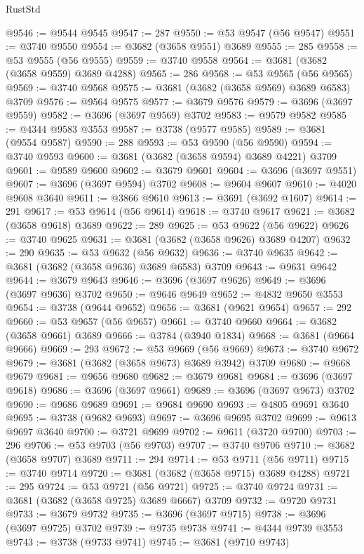 \begin{lexlean}{RustStd}
\begin{coremodule}
@9546 := @9544 @9545
@9547 := 287
@9550 := @53 @9547 (@56 @9547)
@9551 := @3740 @9550
@9554 := @3682 (@3658 @9551) @3689
@9555 := 285
@9558 := @53 @9555 (@56 @9555)
@9559 := @3740 @9558
@9564 := @3681 (@3682 (@3658 @9559) @3689 @4288)
@9565 := 286
@9568 := @53 @9565 (@56 @9565)
@9569 := @3740 @9568
@9575 := @3681 (@3682 (@3658 @9569) @3689 @6583) @3709
@9576 := @9564 @9575
@9577 := @3679 @9576
@9579 := @3696 (@3697 @9559)
@9582 := @3696 (@3697 @9569) @3702
@9583 := @9579 @9582
@9585 := @4344 @9583 @3553
@9587 := @3738 (@9577 @9585)
@9589 := @3681 (@9554 @9587)
@9590 := 288
@9593 := @53 @9590 (@56 @9590)
@9594 := @3740 @9593
@9600 := @3681 (@3682 (@3658 @9594) @3689 @4221) @3709
@9601 := @9589 @9600
@9602 := @3679 @9601
@9604 := @3696 (@3697 @9551)
@9607 := @3696 (@3697 @9594) @3702
@9608 := @9604 @9607
@9610 := @4020 @9608 @3640
@9611 := @3866 @9610
@9613 := @3691 (@3692 @1607)
@9614 := 291
@9617 := @53 @9614 (@56 @9614)
@9618 := @3740 @9617
@9621 := @3682 (@3658 @9618) @3689
@9622 := 289
@9625 := @53 @9622 (@56 @9622)
@9626 := @3740 @9625
@9631 := @3681 (@3682 (@3658 @9626) @3689 @4207)
@9632 := 290
@9635 := @53 @9632 (@56 @9632)
@9636 := @3740 @9635
@9642 := @3681 (@3682 (@3658 @9636) @3689 @6583) @3709
@9643 := @9631 @9642
@9644 := @3679 @9643
@9646 := @3696 (@3697 @9626)
@9649 := @3696 (@3697 @9636) @3702
@9650 := @9646 @9649
@9652 := @4832 @9650 @3553
@9654 := @3738 (@9644 @9652)
@9656 := @3681 (@9621 @9654)
@9657 := 292
@9660 := @53 @9657 (@56 @9657)
@9661 := @3740 @9660
@9664 := @3682 (@3658 @9661) @3689
@9666 := @3784 (@3940 @1834)
@9668 := @3681 (@9664 @9666)
@9669 := 293
@9672 := @53 @9669 (@56 @9669)
@9673 := @3740 @9672
@9679 := @3681 (@3682 (@3658 @9673) @3689 @3942) @3709
@9680 := @9668 @9679
@9681 := @9656 @9680
@9682 := @3679 @9681
@9684 := @3696 (@3697 @9618)
@9686 := @3696 (@3697 @9661)
@9689 := @3696 (@3697 @9673) @3702
@9690 := @9686 @9689
@9691 := @9684 @9690
@9693 := @4805 @9691 @3640
@9695 := @3738 (@9682 @9693)
@9697 := @3696 @9695 @3702
@9699 := @9613 @9697 @3640
@9700 := @3721 @9699
@9702 := @9611 (@3720 @9700)
@9703 := 296
@9706 := @53 @9703 (@56 @9703)
@9707 := @3740 @9706
@9710 := @3682 (@3658 @9707) @3689
@9711 := 294
@9714 := @53 @9711 (@56 @9711)
@9715 := @3740 @9714
@9720 := @3681 (@3682 (@3658 @9715) @3689 @4288)
@9721 := 295
@9724 := @53 @9721 (@56 @9721)
@9725 := @3740 @9724
@9731 := @3681 (@3682 (@3658 @9725) @3689 @6667) @3709
@9732 := @9720 @9731
@9733 := @3679 @9732
@9735 := @3696 (@3697 @9715)
@9738 := @3696 (@3697 @9725) @3702
@9739 := @9735 @9738
@9741 := @4344 @9739 @3553
@9743 := @3738 (@9733 @9741)
@9745 := @3681 (@9710 @9743)

\end{coremodule}
\end{lexlean}
